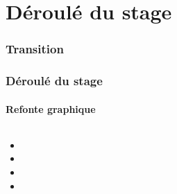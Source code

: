 \documentclass[aspectratio=169]{beamer}
\begin{document}
\section{Déroulé du stage}
\begin{frame}
    \frametitle{Transition}
    \framesubtitle{}
    \tableofcontents[currentsubsection,sectionstyle=show/shaded,subsectionstyle=show/shaded/hide]
\end{frame}
\begin{frame}
    \frametitle{Déroulé du stage}
    \framesubtitle{Refonte graphique}
    \begin{columns}
        \begin{column}{0.3\textwidth}
            \begin{itemize}
                \item<1->
                \item<2->
                \item<3->
                \item<4->
            \end{itemize}
        \end{column}
        \begin{column}{0.6\textwidth}
            \begin{center}
            \end{center}
        \end{column}
    \end{columns}
\end{frame}
\end{document}
